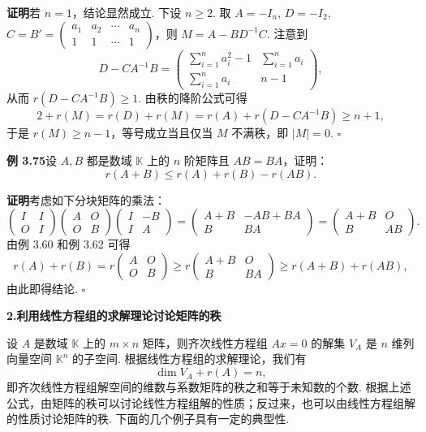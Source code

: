\documentclass[UTF8, 12pt, fontset=fandol, oneside]{ctexart}
\begin{document}
\noindent\textbf{证明}\quad 若 $n=1$，结论显然成立. 下设 $n\ge 2$. 取 $A=-I_n$, $D=-I_2$, $C=B'=\begin{pmatrix}a_1&a_2&\cdots&a_n\\1&1&\cdots&1\end{pmatrix}$，则 $M=A-BD^{-1}C$. 注意到
\[
D-CA^{-1}B=
\begin{pmatrix}
\sum_{i=1}^n a_i^2-1 & \sum_{i=1}^n a_i\\
\sum_{i=1}^n a_i & n-1
\end{pmatrix},
\]
从而 $r(D-CA^{-1}B)\ge 1$. 由秩的降阶公式可得
\[
2+r(M)=r(D)+r(M)=r(A)+r(D-CA^{-1}B)\ge n+1,
\]
于是 $r(M)\ge n-1$，等号成立当且仅当 $M$ 不满秩，即 $|M|=0$. $\square$

\noindent\textbf{例 3.75}\quad 设 $A,B$ 都是数域 $\mathbb{K}$ 上的 $n$ 阶矩阵且 $AB=BA$，证明：
\[
r(A+B)\le r(A)+r(B)-r(AB).
\]

\noindent\textbf{证明}\quad 考虑如下分块矩阵的乘法：
\[
\begin{pmatrix}I&I\\O&I\end{pmatrix}
\begin{pmatrix}A&O\\O&B\end{pmatrix}
\begin{pmatrix}I&-B\\I&A\end{pmatrix}
=
\begin{pmatrix}A+B&-AB+BA\\B&BA\end{pmatrix}
=
\begin{pmatrix}A+B&O\\B&AB\end{pmatrix}.
\]
由例 3.60 和例 3.62 可得
\[
r(A)+r(B)=r\begin{pmatrix}A&O\\O&B\end{pmatrix}
\ge r\begin{pmatrix}A+B&O\\B&BA\end{pmatrix}
\ge r(A+B)+r(AB),
\]
由此即得结论. $\square$

\noindent\textbf{2.\quad 利用线性方程组的求解理论讨论矩阵的秩}

设 $A$ 是数域 $\mathbb{K}$ 上的 $m\times n$ 矩阵，则齐次线性方程组 $Ax=0$ 的解集 $V_A$ 是 $n$ 维列向量空间 $\mathbb{K}^n$ 的子空间. 根据线性方程组的求解理论，我们有
\[
\dim V_A+r(A)=n,
\]
即齐次线性方程组解空间的维数与系数矩阵的秩之和等于未知数的个数. 根据上述公式，由矩阵的秩可以讨论线性方程组解的性质；反过来，也可以由线性方程组解的性质讨论矩阵的秩. 下面的几个例子具有一定的典型性.
\end{document}
